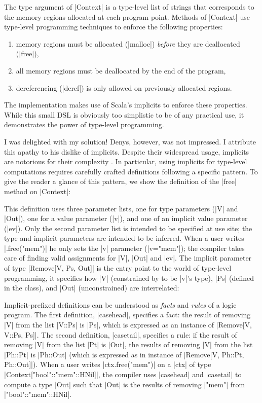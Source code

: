 \memImplicitMainCodeSection

\noindent
The type argument of |Context| is a type-level list of strings that corresponds to the memory regions allocated at each program point.
Methods of |Context| use type-level programming techniques to enforce the following properties:

\begin{enumerate}
  \item memory regions must be allocated (|malloc|) \emph{before} they are deallocated (|free|),
  \item all memory regions must be deallocated by the end of the program,
  \item dereferencing (|deref|) is only allowed on previously allocated regions.
\end{enumerate}

\noindent
The implementation makes use of Scala's implicits to enforce these properties.
While this small DSL is obviously too simplistic to be of any practical use, it demonstrates the power of type-level programming.

I was delighted with my solution!
Denys, however, was not impressed.
I attribute this apathy to his dislike of implicits.
Despite their widespread usage, implicits are notorious for their complexity \citep{filip2019implicits}.
In particular, using implicits for type-level computations requires carefully crafted definitions following a specific pattern.
To give the reader a glance of this pattern, we show the definition of the |free| method on |Context|:

\memImplicitContextCodeSection

\noindent
This definition uses three parameter lists, one for type parameters (|V| and |Out|), one for a value parameter (|v|), and one of an implicit value parameter (|ev|).
Only the second parameter list is intended to be specified at use site; the type and implicit parameters are intended to be inferred.
When a user writes |.free("mem")| he only sets the |v| parameter (|v="mem"|); the compiler takes care of finding valid assignments for |V|, |Out| and |ev|.
The implicit parameter of type |Remove[V, Ps, Out]| is the entry point to the world of type-level programming, it specifies how |V| (constrained by to be |v|'s type), |Ps| (defined in the class), and |Out| (unconstrained) are interrelated:

\memImplicitRemoveCodeSection

\noindent
Implicit-prefixed definitions can be understood as \emph{facts} and \emph{rules} of a logic program.
The first definition, |casehead|, specifies a fact: the result of removing |V| from the list |V::Ps| is |Ps|, which is expressed as an instance of |Remove[V, V::Ps, Ps]|.
The second definition, |casetail|, specifies a rule: if the result of removing |V| from the list |Pt| is |Out|, the results of removing |V| from the list |Ph::Pt| is |Ph::Out| (which is expressed as in instance of |Remove[V, Ph::Pt, Ph::Out]|).
When a user writes |ctx.free("mem")| on a |ctx| of type |Context["bool"::"mem"::HNil]|, the compiler uses |casehead| and |casetail| to compute a type |Out| such that |Out| is the results of removing |"mem"| from |"bool"::"mem"::HNil|.

